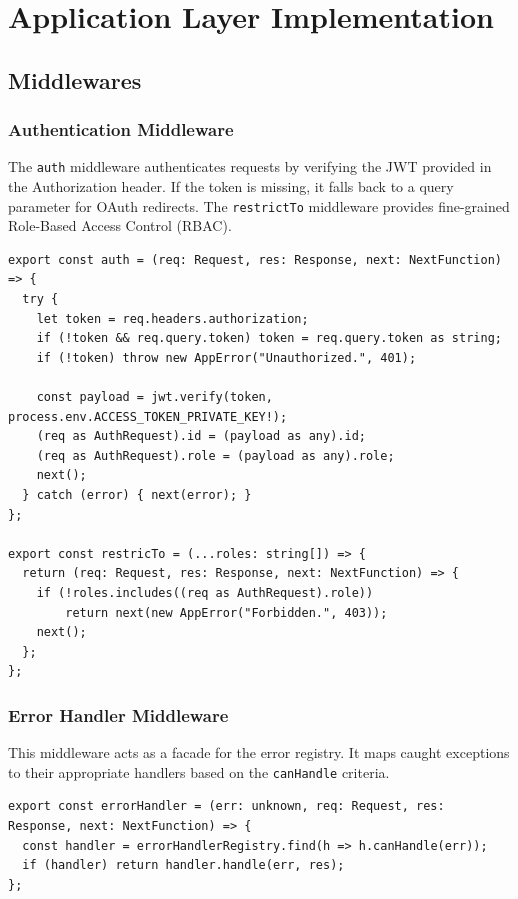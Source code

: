 \section{Application Layer Implementation}
\subsection{Middlewares}
\subsubsection{Authentication Middleware}
The \texttt{auth} middleware authenticates requests by verifying the JWT provided in the Authorization header. If the token is missing, it falls back to a query parameter for OAuth redirects. The \texttt{restrictTo} middleware provides fine-grained Role-Based Access Control (RBAC).

\begin{lstlisting}
export const auth = (req: Request, res: Response, next: NextFunction) => {
  try {
    let token = req.headers.authorization;
    if (!token && req.query.token) token = req.query.token as string;
    if (!token) throw new AppError("Unauthorized.", 401);

    const payload = jwt.verify(token, process.env.ACCESS_TOKEN_PRIVATE_KEY!);
    (req as AuthRequest).id = (payload as any).id;
    (req as AuthRequest).role = (payload as any).role;
    next();
  } catch (error) { next(error); }
};

export const restricTo = (...roles: string[]) => {
  return (req: Request, res: Response, next: NextFunction) => {
    if (!roles.includes((req as AuthRequest).role)) 
        return next(new AppError("Forbidden.", 403));
    next();
  };
};
\end{lstlisting}

\subsubsection{Error Handler Middleware}
This middleware acts as a facade for the error registry. It maps caught exceptions to their appropriate handlers based on the \texttt{canHandle} criteria.

\begin{lstlisting}
export const errorHandler = (err: unknown, req: Request, res: Response, next: NextFunction) => {
  const handler = errorHandlerRegistry.find(h => h.canHandle(err));
  if (handler) return handler.handle(err, res);
};
\end{lstlisting}

